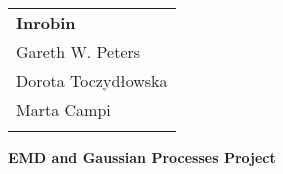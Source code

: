 \documentclass[11pt, a4paper]{article} %
\begin{document}
	
	
\setlength{\parindent}{0pt} %
\onehalfspacing				%


\begin{tabular}{p{15.5cm}}
	{\large \textbf{Inrobin}} \\
	Gareth W. Peters  \\ 
	Dorota Toczydłowska\\
	Marta Campi\\
	\hline
	\\
\end{tabular}

\vspace*{0.3cm}				%


\begin{center}
	{\Large \textbf{EMD and Gaussian Processes Project}}
	\vspace{2mm}	
\end{center} 

\vspace{0.4cm}
\end{document}
